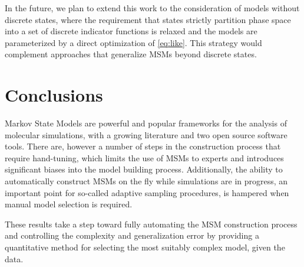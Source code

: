\documentclass[journal=jpcbfk, layout=twocolumn, manuscript=article]{achemso}
\begin{document}
In the future, we plan to extend this work to the consideration of models without discrete states, where the requirement that states strictly partition phase space into a set of discrete indicator functions is relaxed and the models are parameterized by a direct optimization of \cref{eq:like}. This strategy would complement approaches that generalize MSMs beyond discrete states\cite{Noe2013Variational}.

\section{Conclusions}

Markov State Models are powerful and popular frameworks for the analysis of molecular simulations, with a growing literature and two open source software tools\cite{Beauchamp2011Msmbuilder2, Senne2012EMMA}. There are, however a number of steps in the construction process that require hand-tuning, which limits the use of MSMs to experts and introduces significant biases into the model building process. Additionally, the ability to automatically construct MSMs on the fly while simulations are in progress, an important point for so-called adaptive sampling procedures\cite{Bowman2010Enhanced}, is hampered when manual model selection is required. 

These results take a step toward fully automating the MSM construction process and controlling the complexity and generalization error by providing a quantitative method for selecting the most suitably complex model, given the data.

\end{document}
